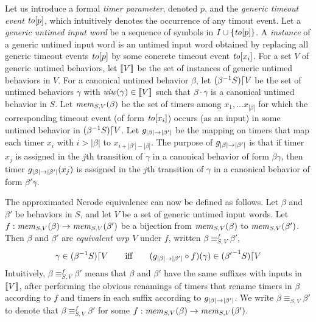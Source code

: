 Let us introduce a formal {\em timer parameter}, denoted $p$, and the
{\em generic timeout event} $\toevent{p}$,
which intuitively denotes the occurrence of any timout event.
Let a {\em generic untimed input word} be a sequence of symbols in
$I \cup \set{\toevent{p}}$.
A {\em instance} of a generic untimed input word is an untimed input
word obtained by replacing all generic timeout events
$\toevent{p}$ by some concrete timeout event $\toevent{x_i}$.
For a set $V$ of generic untimed behaviors, let $\instancesof{V}$ be the
set of instances of generic untimed behaviors in $V$. For a canonical untimed
behavior $\beta$, let $\suffixbehs{S}{\beta}{V}$ be the set of untimed behaviors
$\gamma$ with $\untimedinputword(\gamma) \in \instancesof{V}$ such that
$\beta\cdot\gamma$ is a canonical untimed behavior in $S$. Let
$\getmemorable{S}{\beta}{V}$ be the set of timers among
$x_1 , \ldots x_{|\beta|}$ for which the corresponding timeout event
(of form $\toevent{x_i}$) occurs (as an input) in some untimed behavior in
$\suffixbehs{S}{\beta}{V}$.
Let $\suffbij{\beta}{\beta'}$ be the mapping on timers that map each
timer $x_i$ with $i > |\beta|$ to $x_{i + |\beta'| - |\beta|}$.
The purpose of $\suffbij{\beta}{\beta'}$ is that if timer $x_j$ is assigned
in the $j$th transition of $\gamma$ in a canonical behavior of form
$\beta\gamma$, then timer $\suffbij{\beta}{\beta'}(x_j)$ is assigned 
in the $j$th transition of $\gamma$ in a canonical behavior of form
$\beta'\gamma$.


The approximated Nerode equivalence can now be defined as follows.
Let $\beta$ and $\beta'$ be behaviors in $S$, and let  $V$ be a set of
generic untimed input words.
Let $f : \getmemorable{S}{\beta}{V} \to \getmemorable{S}{\beta'}{V}$
be a bijection
from $\getmemorable{S}{\beta}{V}$ to $\getmemorable{S}{\beta'}{V}$.
Then $\beta$ and $\beta'$ are \emph{equivalent wrp $V$} under $f$, written
$\beta \equiv_{S,V}^f \beta'$, 
\[
\gamma \in \suffixbehs{S}{\beta}{V}
\qquad \mbox{iff} \qquad
(\suffbij{\beta}{\beta'} \circ f) (\gamma) \in \suffixbehs{S}{\beta'}{V}
\]
Intuitively, $\beta \equiv_{S,V}^f \beta'$ means that $\beta$ and $\beta'$
have the same suffixes with inputs in $\instancesof{V}$, after performing the
obvious renamings of timers that rename timers in $\beta$ according to
$f$ and timers in each suffix according to $\suffbij{\beta}{\beta'}$.
We write $\beta \equiv_{S,V} \beta'$ to denote that
$\beta \equiv_{S,V}^f \beta'$ for some
$f : \getmemorable{S}{\beta}{V} \to \getmemorable{S}{\beta'}{V}$.

